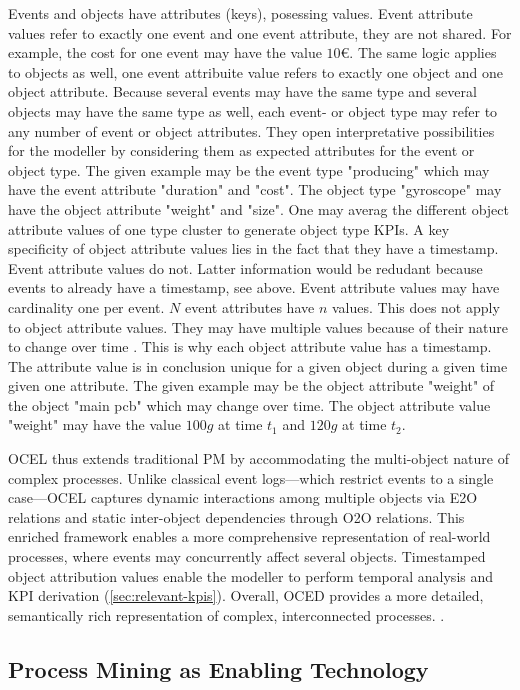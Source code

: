 Events and objects have attributes (keys), posessing values. Event attribute values refer to exactly one event and one event attribute, they are not shared. For example, the cost for one event may have the value $10€$. The same logic applies to objects as well, one event attribuite value refers to exactly one object and one object attribute. Because several events may have the same type and several objects may have the same type as well, each event- or object type may refer to any number of event or object attributes. They open interpretative possibilities for the modeller by considering them as expected attributes for the event or object type. The given example may be the event type "producing" which may have the event attribute "duration" and "cost". The object type "gyroscope" may have the object attribute "weight" and "size". One may averag the different object attribute values of one type cluster to generate object type KPIs. A key specificity of object attribute values lies in the fact that they have a timestamp. Event attribute values do not. Latter information would be redudant because events to already have a timestamp, see above. Event attribute values may have cardinality one per event. $N$ event attributes have $n$ values. This does not apply to object attribute values. They may have multiple values because of their nature to change over time \autocite{van2023object}. This is why each object attribute value has a timestamp. The attribute value is in conclusion unique for a given object during a given time given one attribute. The given example may be the object attribute "weight" of the object "main pcb" which may change over time. The object attribute value "weight" may have the value $100g$ at time $t_1$ and $120g$ at time $t_2$.

OCEL thus extends traditional PM by accommodating the  multi-object nature of complex processes. Unlike classical event logs—which restrict events to a single case—OCEL captures dynamic interactions among multiple objects via E2O relations and static inter-object dependencies through O2O relations. This enriched framework enables a more comprehensive representation of real-world processes, where events may concurrently affect several objects. Timestamped object attribution values enable the modeller to perform temporal analysis and KPI derivation (\autoref{sec:relevant-kpis}). Overall, OCED provides a more detailed, semantically rich representation of complex, interconnected processes. \autocite{van2023object}.

\subsection{Process Mining as Enabling Technology}
\label{sec:process-mining-enabling-technology}

